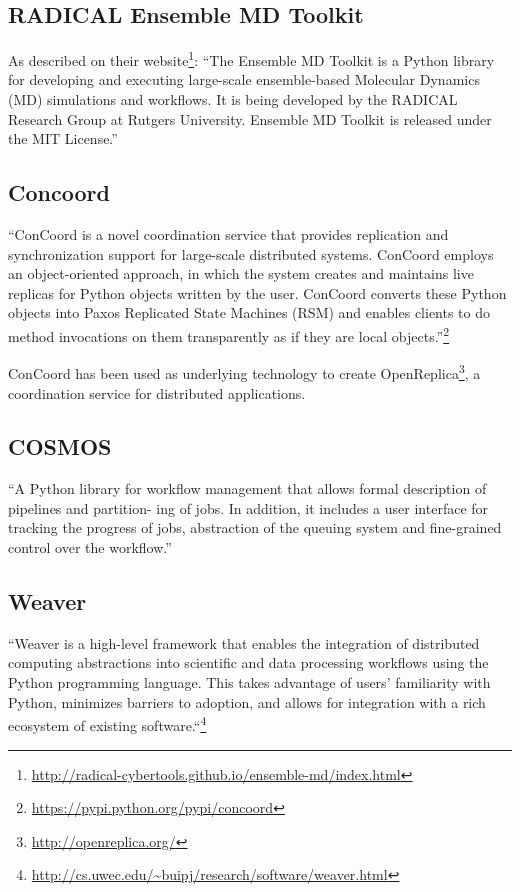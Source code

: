 \subsection{RADICAL Ensemble MD Toolkit}
As described on their website\footnote{\url{http://radical-cybertools.github.io/ensemble-md/index.html}}:
``The Ensemble MD Toolkit is a Python library for developing and executing large-scale ensemble-based
Molecular Dynamics (MD) simulations and workflows. It is being developed by the RADICAL Research
Group at Rutgers University. Ensemble MD Toolkit is released under the MIT License.''

\subsection{Concoord}
``ConCoord is a novel coordination service that provides replication and synchronization 
support for large-scale distributed systems. ConCoord employs an object-oriented approach, 
in which the system creates and maintains live replicas for Python objects written by the user. 
ConCoord converts these Python objects into Paxos Replicated State Machines (RSM) and enables clients
to do method invocations on them transparently as if they are local objects.''\footnote{\url{https://pypi.python.org/pypi/concoord}}

ConCoord has been used as underlying technology to create OpenReplica\footnote{\url{http://openreplica.org/}}, 
a coordination service for distributed applications.\cite{altinbuken2012commodifying}

\subsection{COSMOS}
``A Python library for workflow
management that allows formal description of pipelines and partition-
ing of jobs. In addition, it includes a user interface for tracking the
progress of jobs, abstraction of the queuing system and fine-grained
control over the workflow.''\cite{Gafni30062014}

\subsection{Weaver}
``Weaver\cite{Bui_weaver:integrating} is a high-level framework that enables the integration of distributed computing abstractions
into scientific and data processing workflows using the Python programming language. 
This takes advantage of users' familiarity with Python, minimizes barriers to adoption, 
and allows for integration with a rich ecosystem of existing software.``\footnote{\url{http://cs.uwec.edu/~buipj/research/software/weaver.html}}

